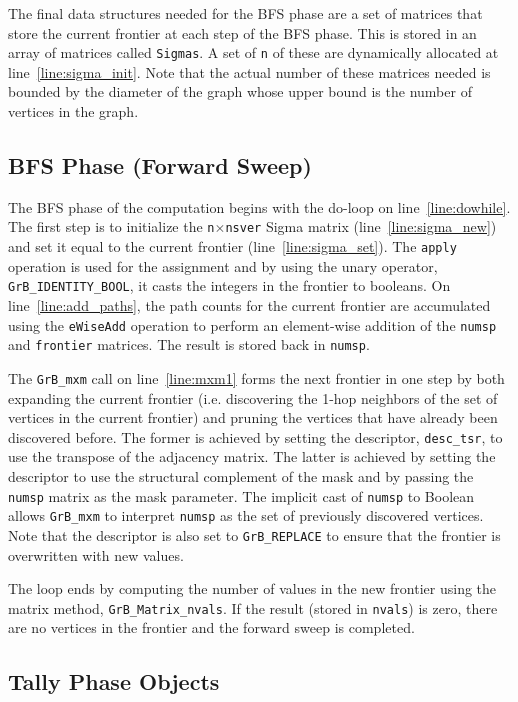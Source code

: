 The final data structures needed for the BFS phase are a set of matrices that
store the current frontier at each step of the BFS phase.  This is stored in
an array of  matrices called {\tt Sigmas}.  A set of {\tt n} 
of these are dynamically allocated at line~\ref{line:sigma_init}.  Note that the 
actual number of these matrices needed is bounded by the diameter of the graph whose
upper bound is the number of vertices in the graph.


\subsection{BFS Phase (Forward Sweep)}

The BFS phase of the computation begins with the do-loop on line~\ref{line:dowhile}. 
The first step is to initialize the {\tt n}$\times${\tt nsver} Sigma matrix 
(line~\ref{line:sigma_new}) and set it equal to the current frontier 
(line~\ref{line:sigma_set}).  The {\tt apply} operation
is used for the assignment and by using the unary operator, {\tt GrB\_IDENTITY\_BOOL},
it casts the integers in the frontier to booleans.
On line~\ref{line:add_paths}, the path counts for the current frontier are
accumulated using the {\tt eWiseAdd} operation to perform an element-wise addition of
the {\tt numsp} and {\tt frontier} matrices.  The result is stored back in {\tt numsp}. 

The {\tt GrB\_mxm} call on line~\ref{line:mxm1} forms the next frontier in one step 
by both expanding the current frontier (i.e. discovering the 1-hop neighbors 
of the set of vertices in the current frontier) and pruning the vertices 
that have already been discovered before. The former is achieved by setting the
descriptor, {\tt desc\_tsr}, to use the transpose of the adjacency matrix. The 
latter is achieved by setting the descriptor to use the structural complement of the mask 
and by passing the {\tt numsp} matrix as the mask parameter. The 
implicit cast of {\tt numsp} to Boolean allows {\tt GrB\_mxm} to interpret 
{\tt numsp} as the set of previously discovered vertices.  Note that the descriptor is 
also set to {\tt GrB\_REPLACE} to ensure that the frontier is overwritten with new
values.

The loop ends by computing the number of values in the new frontier using the
matrix method, {\tt GrB\_Matrix\_nvals}.  If the result (stored in {\tt nvals}) 
is zero, there are no vertices in the frontier and the forward sweep is completed.

\subsection{Tally Phase Objects}

